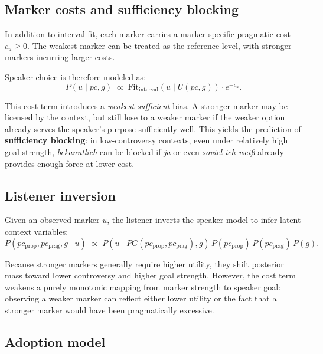 \documentclass[12pt]{article}
\begin{document}
\subsection{Marker costs and sufficiency blocking}

In addition to interval fit, each marker carries a marker-specific pragmatic
cost $c_u \geq 0$. The weakest marker can be treated as the reference level,
with stronger markers incurring larger costs.

Speaker choice is therefore modeled as:
\begin{equation}
P(u \mid pc,g)
\;\propto\;
\mathrm{Fit}_{\mathrm{interval}}\!\left(u \mid U(pc,g)\right)
\cdot e^{-c_u}.
\label{eq:model-choice}
\end{equation}

This cost term introduces a \emph{weakest-sufficient} bias. A stronger marker
may be licensed by the context, but still lose to a weaker marker if the weaker
option already serves the speaker's purpose sufficiently well. This yields the
prediction of \textbf{sufficiency blocking}: in low-controversy contexts, even
under relatively high goal strength, \textit{bekanntlich} can be blocked if
\textit{ja} or even \textit{soviel ich wei\ss} already provides enough force
at lower cost.

\subsection{Listener inversion}

Given an observed marker $u$, the listener inverts the speaker model to infer
latent context variables:
\begin{equation}
P(pc_{\text{prop}}, pc_{\text{prag}}, g \mid u)
\;\propto\;
P\!\left(u \mid PC(pc_{\text{prop}}, pc_{\text{prag}}), g\right)
\,P(pc_{\text{prop}})\,P(pc_{\text{prag}})\,P(g).
\label{eq:model-posterior}
\end{equation}

Because stronger markers generally require higher utility, they shift posterior
mass toward lower controversy and higher goal strength. However, the cost term
weakens a purely monotonic mapping from marker strength to speaker goal:
observing a weaker marker can reflect either lower utility or the fact that a
stronger marker would have been pragmatically excessive.

\subsection{Adoption model}
\end{document}
